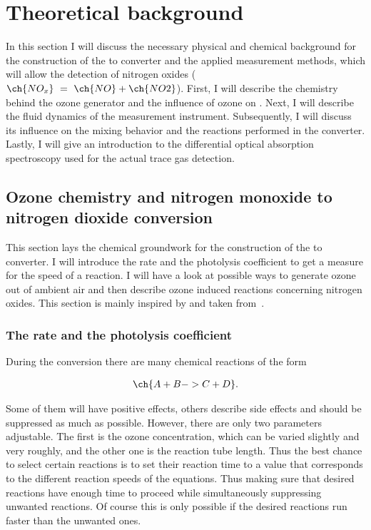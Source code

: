 \section{Theoretical background}
\label{sec:theory}

In this section I will discuss the necessary physical and chemical
background for the construction of the  to  converter
and the applied measurement methods, which will allow the detection of
nitrogen oxides ($\ch{NO_x}\ =\ \ch{NO} + \ch{NO2}$). First, I will
describe the chemistry behind the ozone generator and the influence of
ozone on . Next, I will describe the fluid dynamics of the
measurement instrument. Subsequently, I will discuss its influence on the
mixing behavior and the reactions performed in the converter. Lastly,
I will give an introduction to the differential optical absorption
spectroscopy used for the actual trace gas detection.

\subsection{Ozone chemistry and nitrogen monoxide to nitrogen dioxide conversion}
\label{sec:chemistry}

This section lays the chemical groundwork for the construction of the
 to  converter. I will introduce the rate and the
photolysis coefficient to get a measure for the speed of a
reaction. I will have a look at possible ways to generate
ozone out of ambient air and then describe ozone induced reactions
concerning nitrogen oxides. This section is mainly inspired by and
taken from~\cite{bsc}.

\subsubsection{The rate and the photolysis coefficient}
\label{sec:rate}

During the conversion there are many chemical reactions of the form

\begin{align}
  \ch{A + B -> C + D}. \label{eq:prototype}
\end{align}

Some of them will have positive effects, others describe side effects
and should be suppressed as much as possible. However, there are only
two parameters adjustable. The first is the ozone concentration, which
can be varied slightly and very roughly, and the other one is the
reaction tube length. Thus the best chance to select certain reactions
is to set their reaction time to a value that corresponds to the
different reaction speeds of the equations. Thus making sure that
desired reactions have enough time to proceed while simultaneously
suppressing unwanted reactions. Of course this is only possible if
the desired reactions run faster than the unwanted ones.

